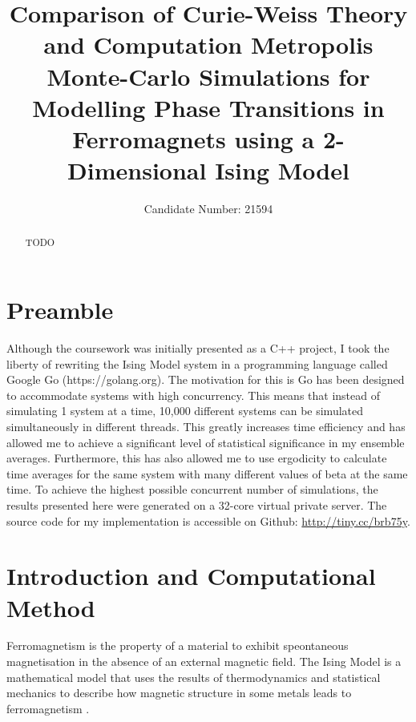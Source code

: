 \documentclass[11pt]{iopart}
\begin{document}
\section*{Preamble}
Although the coursework was initially presented as a C++ project, I took the liberty of rewriting the Ising Model system in a programming language called Google Go (https://golang.org). The motivation for this is Go has been designed to accommodate systems with high concurrency. This means that instead of simulating 1 system at a time, 10,000 different systems can be simulated simultaneously in different threads. This greatly increases time efficiency and has allowed me to achieve a significant level of statistical significance in my ensemble averages. Furthermore, this has also allowed me to use ergodicity to calculate time averages for the same system with many different values of beta at the same time. To achieve the highest possible concurrent number of simulations, the results presented here were generated on a 32-core virtual private server. The source code for my implementation is accessible on Github: \url{http://tiny.cc/brb75y}.\cleardoublepage

\setlength{\marginparwidth}{1.5cm}

\title[]{Comparison of Curie-Weiss Theory and Computation Metropolis Monte-Carlo Simulations for Modelling Phase Transitions in Ferromagnets using a 2-Dimensional Ising Model}

\author{Candidate Number: 21594}

\address{Department of Physics,
University of Bath, Bath BA2 7AY, United Kingdom}
\begin{abstract}
TODO
\end{abstract}



\section{Introduction and Computational Method}
Ferromagnetism is the property of a material to exhibit speontaneous magnetisation in the absence of an external magnetic field. The Ising Model is a mathematical model that uses the results of thermodynamics and statistical mechanics to describe how magnetic structure in some metals leads to ferromagnetism \cite{handout}.
\end{document}
